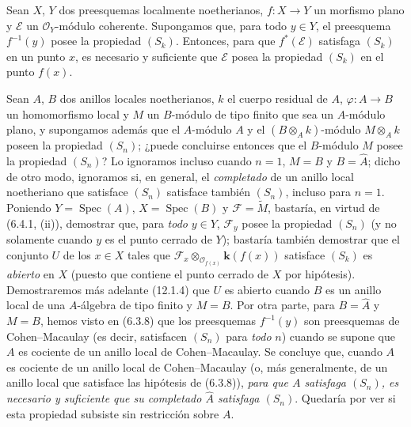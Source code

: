 \begin{corollary}[6.4.2]
\label{IV.2.s6.4.2-fr}
Sean $X$, $Y$ dos preesquemas localmente noetherianos, $f:X\to Y$ un
morfismo plano y $\mathscr E$ un $\mathcal O_Y$-módulo coherente. Supongamos
que, para todo $y\in Y$, el preesquema $f^{-1}(y)$ posee la propiedad $(S_k)$.
Entonces, para que $f^*(\mathscr E)$ satisfaga $(S_k)$ en un punto $x$, es
necesario y suficiente que $\mathscr E$ posea la propiedad $(S_k)$ en el punto
$f(x)$.
\end{corollary}

\begin{remark}[6.4.3]
\label{IV.2.s6.4.3-fr}
Sean $A$, $B$ dos anillos locales noetherianos, $k$ el cuerpo residual de
$A$, $\varphi:A\to B$ un homomorfismo local y $M$ un $B$-módulo de tipo finito
que sea un $A$-módulo plano, y supongamos además que el $A$-módulo $A$ y el
$(B\otimes_Ak)$-módulo $M\otimes_Ak$ poseen la propiedad $(S_n)$; ¿puede
concluirse entonces que el $B$-módulo $M$ posee la propiedad $(S_n)$? Lo
ignoramos incluso cuando $n=1$, $M=B$ y $B=\widehat A$; dicho de otro modo,
ignoramos si, en general, el \emph{completado} de un anillo local noetheriano
que satisface $(S_n)$ satisface también $(S_n)$, incluso para $n=1$. Poniendo
$Y=\operatorname{Spec}(A)$, $X=\operatorname{Spec}(B)$ y
$\mathscr F=\widetilde M$, bastaría, en virtud de (6.4.1, (ii)), demostrar que,
para \emph{todo} $y\in Y$, $\mathscr F_y$ posee la propiedad $(S_n)$
(y no solamente cuando $y$ es el punto cerrado de $Y$); bastaría también
demostrar que el conjunto $U$ de los $x\in X$ tales que
$\mathscr F_x\otimes_{\mathcal O_{f(x)}}\boldsymbol{k}(f(x))$ satisface $(S_k)$ es \emph{abierto}
en $X$ (puesto que contiene el punto cerrado de $X$ por hipótesis).
Demostraremos más adelante (12.1.4) que $U$ es abierto cuando $B$ es un anillo
local de una $A$-álgebra de tipo finito y $M=B$. Por otra parte, para
$B=\widehat A$ y $M=B$, hemos visto en (6.3.8) que los preesquemas
$f^{-1}(y)$ son preesquemas de Cohen--Macaulay (es decir, satisfacen
$(S_n)$ para \emph{todo} $n$) cuando se supone que $A$ es cociente de un
anillo local de Cohen--Macaulay. Se concluye que, cuando $A$ es cociente de
un anillo local de Cohen--Macaulay (o, más generalmente, de un anillo local
que satisface las hipótesis de (6.3.8)), \emph{para que $A$ satisfaga $(S_n)$,
es necesario y suficiente que su completado $\widehat A$ satisfaga $(S_n)$}.
Quedaría por ver si esta propiedad subsiste sin restricción sobre $A$.
\end{remark}
